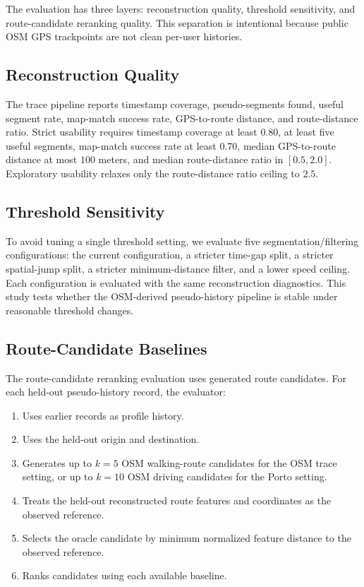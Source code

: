 The evaluation has three layers: reconstruction quality, threshold sensitivity, and route-candidate reranking quality. This separation is intentional because public OSM GPS trackpoints are not clean per-user histories.

\subsection{Reconstruction Quality}
The trace pipeline reports timestamp coverage, pseudo-segments found, useful segment rate, map-match success rate, GPS-to-route distance, and route-distance ratio. Strict usability requires timestamp coverage at least $0.80$, at least five useful segments, map-match success rate at least $0.70$, median GPS-to-route distance at most $100$ meters, and median route-distance ratio in $[0.5, 2.0]$. Exploratory usability relaxes only the route-distance ratio ceiling to $2.5$.

\subsection{Threshold Sensitivity}
To avoid tuning a single threshold setting, we evaluate five segmentation/filtering configurations: the current configuration, a stricter time-gap split, a stricter spatial-jump split, a stricter minimum-distance filter, and a lower speed ceiling. Each configuration is evaluated with the same reconstruction diagnostics. This study tests whether the OSM-derived pseudo-history pipeline is stable under reasonable threshold changes.

\subsection{Route-Candidate Baselines}
The route-candidate reranking evaluation uses generated route candidates. For each held-out pseudo-history record, the evaluator:

\begin{enumerate}
  \item Uses earlier records as profile history.
  \item Uses the held-out origin and destination.
  \item Generates up to $k=5$ OSM walking-route candidates for the OSM trace setting, or up to $k=10$ OSM driving candidates for the Porto setting.
  \item Treats the held-out reconstructed route features and coordinates as the observed reference.
  \item Selects the oracle candidate by minimum normalized feature distance to the observed reference.
  \item Ranks candidates using each available baseline.
\end{enumerate}

